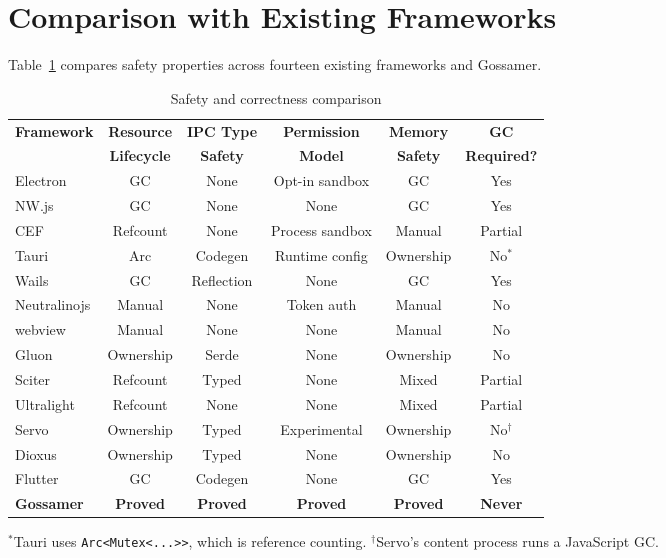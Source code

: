 \documentclass[11pt,a4paper]{article}
\theoremstyle{definition}
\begin{document}
\section{Comparison with Existing Frameworks}
\label{sec:comparison}

Table~\ref{tab:safety} compares safety properties across fourteen
existing frameworks and Gossamer.

\begin{table}[ht]
\centering
\caption{Safety and correctness comparison}
\label{tab:safety}
\small
\begin{tabular}{@{}lccccc@{}}
\toprule
\textbf{Framework} & \textbf{Resource} & \textbf{IPC Type} & \textbf{Permission} & \textbf{Memory} & \textbf{GC} \\
 & \textbf{Lifecycle} & \textbf{Safety} & \textbf{Model} & \textbf{Safety} & \textbf{Required?} \\
\midrule
Electron      & GC           & None       & Opt-in sandbox  & GC         & Yes \\
NW.js         & GC           & None       & None            & GC         & Yes \\
CEF           & Refcount     & None       & Process sandbox & Manual     & Partial \\
Tauri         & Arc          & Codegen    & Runtime config  & Ownership  & No$^*$ \\
Wails         & GC           & Reflection & None            & GC         & Yes \\
Neutralinojs  & Manual       & None       & Token auth      & Manual     & No \\
webview       & Manual       & None       & None            & Manual     & No \\
Gluon         & Ownership    & Serde      & None            & Ownership  & No \\
Sciter        & Refcount     & Typed      & None            & Mixed      & Partial \\
Ultralight    & Refcount     & None       & None            & Mixed      & Partial \\
Servo         & Ownership    & Typed      & Experimental    & Ownership  & No$^\dagger$ \\
Dioxus        & Ownership    & Typed      & None            & Ownership  & No \\
Flutter       & GC           & Codegen    & None            & GC         & Yes \\
\midrule
\textbf{Gossamer} & \textbf{Proved} & \textbf{Proved} & \textbf{Proved} & \textbf{Proved} & \textbf{Never} \\
\bottomrule
\end{tabular}
\par\smallskip
{\footnotesize $^*$Tauri uses \texttt{Arc<Mutex<...>>}, which is reference counting.
$^\dagger$Servo's content process runs a JavaScript GC.}
\end{table}
\end{document}
